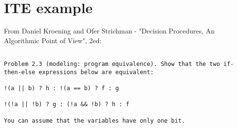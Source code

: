 \section{\ac{ITE} example}

From Daniel Kroening and Ofer Strichman - "Decision Procedures, An Algorithmic Point of View", 2ed:

\begin{lstlisting}

Problem 2.3 (modeling: program equivalence). Show that the two if-then-else expressions below are equivalent:

!(a || b) ? h : !(a == b) ? f : g

!(!a || !b) ? g : (!a && !b) ? h : f

You can assume that the variables have only one bit.

\end{lstlisting}



